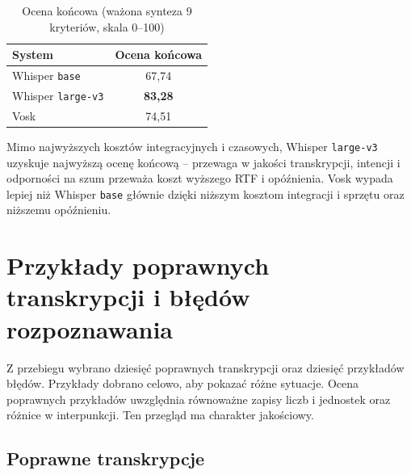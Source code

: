 \documentclass{article}
\begin{document}
\begin{table}[htbp]
\centering
\caption{Ocena końcowa (ważona synteza 9 kryteriów, skala 0--100)}
\label{tab:ocena-koncowa}
\begin{tabular}{lc}
\toprule
\textbf{System} & \textbf{Ocena końcowa} \\
\midrule
Whisper \texttt{base}     & 67,74 \\
Whisper \texttt{large-v3} & \textbf{83,28} \\
Vosk                     & 74,51 \\
\bottomrule
\end{tabular}
\end{table}

Mimo najwyższych kosztów integracyjnych i czasowych, Whisper
\texttt{large-v3} uzyskuje najwyższą ocenę końcową -- przewaga w jakości
transkrypcji, intencji i odporności na szum przeważa koszt wyższego RTF i
opóźnienia. Vosk wypada lepiej niż Whisper \texttt{base} głównie dzięki
niższym kosztom integracji i sprzętu oraz niższemu opóźnieniu.

\section{Przykłady poprawnych transkrypcji i błędów rozpoznawania}

Z przebiegu wybrano dziesięć poprawnych transkrypcji oraz dziesięć przykładów błędów. Przykłady dobrano celowo, aby pokazać różne sytuacje. Ocena poprawnych przykładów uwzględnia równoważne zapisy liczb i jednostek oraz różnice w interpunkcji. Ten przegląd ma charakter jakościowy.

\subsection{Poprawne transkrypcje}
\end{document}
